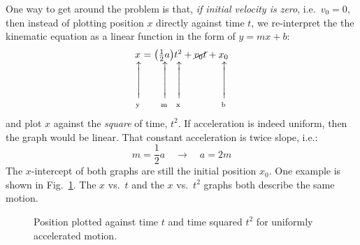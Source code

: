 \documentclass{../../../oss-handout}
\makeatletter
\newcommand\vertarrowbox[2]{%
    \begin{array}[t]{@{}c@{}} #1 \\
    \rotatebox{90}{$\xrightarrow{\hphantom{abcdefgh}}$} \\[-1ex]
    \mathclap{\scriptstyle\text{#2}}%
    \end{array}}
\makeatother
\begin{document}
One way to get around the problem is that, \emph{if initial velocity is zero},
i.e.\ $v_0=0$, then instead of plotting position $x$ directly against time $t$,
we re-interpret the the kinematic equation as a linear function in the form
of $y=mx+b$:
\begin{equation}
  \vertarrowbox{x}{y}=\vertarrowbox{\left(\frac12 a\right)}{m}
  \vertarrowbox{t^2}{x}+
  \cancel{v_0t}+
  \vertarrowbox{x_0}{b}
\end{equation}
and plot $x$ against the \emph{square} of time, $t^2$. If acceleration is
indeed uniform, then the graph would be linear. That constant acceleration is
twice slope, i.e.:
\begin{equation*}
  m=\frac12 a\quad\rightarrow\quad a=2m
\end{equation*}
The $x$-intercept of both graphs are still the initial position $x_0$. One
example is shown in Fig.~\ref{switch1}. The $x$ vs.\ $t$ and the $x$ vs.\
$t^2$ graphs both describe the same motion.
\begin{figure}[!ht]
  \centering
  \hspace{.15in}
  \caption{Position plotted against time $t$ and time squared $t^2$ for
    uniformly accelerated motion.}
  \label{switch1}
\end{figure} 
\end{document}
